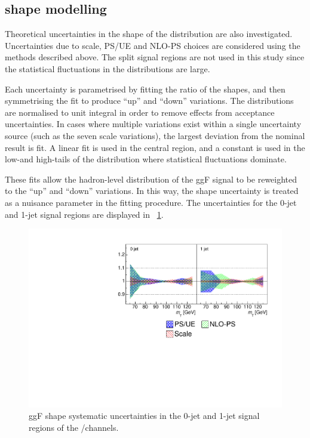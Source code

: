 \subsection{\mt shape modelling}
\label{sec:ggF:mt}

Theoretical uncertainties in the shape of the \mt distribution are also investigated. 
Uncertainties due to scale, PS/UE and NLO-PS choices are 
considered using the methods described above. The split signal regions are not used in 
this study since the statistical fluctuations in the \mt distributions are large.

Each uncertainty is parametrised by fitting the ratio of the \mt shapes, and then 
symmetrising the fit to produce ``up'' and ``down'' variations. The \mt distributions are 
normalised to unit integral in order to remove effects from acceptance uncertainties. 
In cases where multiple variations exist within a single uncertainty source (such as the 
seven scale variations), the largest deviation from the nominal result is fit. A linear 
fit is used in the central \mt region, and a constant is used in the low-\mt and 
high-\mt tails of the distribution where statistical fluctuations dominate.

These fits allow the hadron-level \mt distribution of the ggF signal to be reweighted 
to the ``up'' and ``down'' variations. In this way, the \mt shape uncertainty is treated 
as a nuisance parameter in the \HWW fitting procedure. The uncertainties for the 0-jet 
and 1-jet signal regions are displayed in \Figure~\ref{fig:signal:mTshape}.

\begin{figure}[t]
	\includegraphics[width=\largefigwidth]{custom_images/mT-shapes/ggf}
	\caption{ggF \mt shape systematic uncertainties in the 0-jet and 1-jet signal regions 
	of the \emch/\mech channels.}
	\label{fig:signal:mTshape}
\end{figure}



